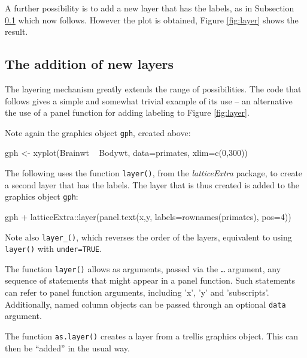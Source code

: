 \documentclass{tufte-book}\usepackage[]{graphicx}\usepackage[]{color}
\newcommand{\txtt}[1]{\texttt{#1}}
\begin{document}
A further possibility is to add a new layer that has the labels, as
in Subsection \ref{ss:layer} which now follows.
However the plot is obtained, Figure \ref{fig:layer} shows the result.

\subsection{The addition of new layers}\label{ss:layer}
The layering mechanism greatly extends the range of possibilities.
The code that follows gives a simple and somewhat trivial example
of its use -- an alternative the use of a panel function for adding
labeling to Figure \ref{fig:layer}.

Note again the graphics object \txtt{gph}, created above:
\begin{Schunk}
\begin{Sinput}
gph <- xyplot(Brainwt ~ Bodywt,  data=primates,
              xlim=c(0,300))
\end{Sinput}
\end{Schunk}
\noindent
The following uses the function \txtt{layer()}, from the
\textit{latticeExtra} package, to create a second layer that has the
labels. The layer that is thus created is added to the graphics object
\txtt{gph}:
\begin{Schunk}
\begin{Sinput}
gph + latticeExtra::layer(panel.text(x,y,
                       labels=rownames(primates),
                       pos=4))
\end{Sinput}
\end{Schunk}
\noindent Note also
\texttt{layer\_()}, which reverses the order of the layers,
equivalent to using \txtt{layer()} with \txtt{under=TRUE}.

The function \txtt{layer()} allows as arguments,
passed via the \txtt{\ldots} argument, any sequence of statements
that might appear in a panel function.  Such statements can refer to
panel function arguments, including 'x', 'y' and 'subscripts'.
Additionally, named column objects can be passed through an optional
\txtt{data} argument.

The function \txtt{as.layer()} creates a layer from a trellis graphics
object.  This can then be ``added'' in the usual way.
\end{document}
